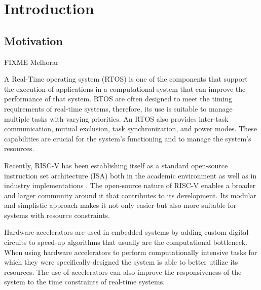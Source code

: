 
\chapter{Introduction}
\label{chapter:introduction}

\section{Motivation}
\label{section:motivation}
FIXME Melhorar

A Real-Time operating system (RTOS) is one of the components that support the execution of applications in a computational system that can improve the performance of that system. RTOS are often designed to meet the timing requirements of real-time systems, therefore, its use is suitable to manage multiple tasks with varying priorities. An RTOS also provides inter-task communication, mutual exclusion, task synchronization, and power modes. These capabilities are crucial for the system's functioning and to manage the system's resources.

Recently, RISC-V has been establishing itself as a standard open-source instruction set architecture (ISA) both in the academic environment as well as in industry implementations \cite{Will_RISC-V_Revolutionize_Computing}. The open-source nature of RISC-V enables a broader and larger community around it that contributes to its development. Its modular and simplistic approach makes it not only easier but also more suitable for systems with resource constraints.

Hardware accelerators are used in embedded systems by adding custom digital circuits to speed-up algorithms that usually are the computational bottleneck. When using hardware accelerators to perform computationally intensive tasks for which they were specifically designed the system is able to better utilize its resources. The use of accelerators can also improve the responsiveness of the system to the time constraints of real-time systems.

